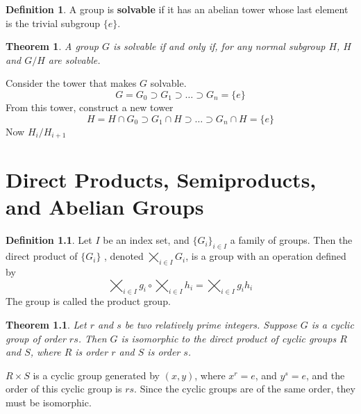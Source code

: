 \documentclass[12pt]{amsbook}
\makeatletter
\theoremstyle{plain}
\newtheorem{theorem}{Theorem}[chapter]
\theoremstyle{definition}
\newtheorem{definition}{Definition}
\renewenvironment{proof}[1][\proofname]{\par
  \pushQED{\qed}%
  \normalfont \topsep6\p@\@plus6\p@\relax
  \list{}{\leftmargin=0em
          \rightmargin=\leftmargin
          \settowidth{\itemindent}{\itshape#1}%
          \labelwidth=\itemindent}

  \item[\hskip\labelsep
        \itshape
    #1\@addpunct{.}]\ignorespaces
}{%
  \popQED\endlist\@endpefalse
}
\makeatother
\begin{document}
\begin{definition}
    A group is {\bf solvable}  if it has an abelian tower whose last element is the trivial subgroup $\{e\}$.
\end{definition}

\begin{theorem}
    A group $G$ is solvable if and only if, for any normal subgroup $H$, $H$ and $G/H$ are solvable.
\end{theorem}
\begin{proof}
    Consider the tower that makes $G$ solvable.
    \[ G = G_0 \supset G_1 \supset \dots \supset G_n = \{ e \} \]
    From this tower, construct a new tower
    \[ H = H \cap G_0 \supset G_1 \cap H \supset \dots \supset G_n \cap H = \{ e \} \]
    Now $H_i/H_{i+1}$
\end{proof}







\chapter{Direct Products, Semiproducts, and Abelian Groups}

\begin{definition}
Let $I$ be an index set, and $\{ G_i \}_{i \in I}$ a family of groups. Then the direct product of $\{ G_i \}$ , denoted $\bigtimes_{i \in I} G_i$, is a group with an operation defined by
%
\[ \bigtimes_{i \in I} g_i \circ \bigtimes_{i \in I} h_i = \bigtimes_{i \in I} g_ih_i \]
%
The group is called the product group.
\end{definition}

\begin{theorem}
Let $r$ and $s$ be two relatively prime integers. Suppose $G$ is a cyclic group of order $rs$. Then $G$ is isomorphic to the direct product of cyclic groups $R$ and $S$, where $R$ is order $r$ and $S$ is order $s$.
\end{theorem}
\begin{proof}
    $R \times S$ is a cyclic group generated by $(x,y)$, where $x^r = e$, and $y^s = e$, and the order of this cyclic group is $rs$. Since the cyclic groups are of the same order, they must be isomorphic.
\end{proof}
\end{document}
